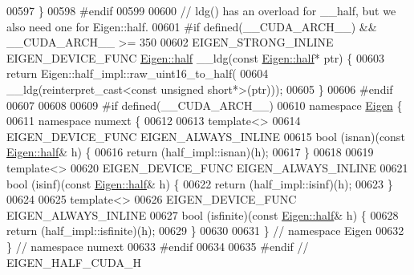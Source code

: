 \begin{DoxyCode}
00597 \}
00598 \textcolor{preprocessor}{#endif}
00599 
00600 \textcolor{comment}{// ldg() has an overload for \_\_half, but we also need one for Eigen::half.}
00601 \textcolor{preprocessor}{#if defined(\_\_CUDA\_ARCH\_\_) && \_\_CUDA\_ARCH\_\_ >= 350}
00602 EIGEN\_STRONG\_INLINE EIGEN\_DEVICE\_FUNC \hyperlink{struct_eigen_1_1half}{Eigen::half} \_\_ldg(\textcolor{keyword}{const} 
      \hyperlink{struct_eigen_1_1half}{Eigen::half}* ptr) \{
00603   \textcolor{keywordflow}{return} Eigen::half\_impl::raw\_uint16\_to\_half(
00604       \_\_ldg(reinterpret\_cast<const unsigned short*>(ptr)));
00605 \}
00606 \textcolor{preprocessor}{#endif}
00607 
00608 
00609 \textcolor{preprocessor}{#if defined(\_\_CUDA\_ARCH\_\_)}
00610 \textcolor{keyword}{namespace }\hyperlink{namespace_eigen}{Eigen} \{
00611 \textcolor{keyword}{namespace }numext \{
00612 
00613 \textcolor{keyword}{template}<>
00614 EIGEN\_DEVICE\_FUNC EIGEN\_ALWAYS\_INLINE
00615 bool (isnan)(\textcolor{keyword}{const} \hyperlink{struct_eigen_1_1half}{Eigen::half}& h) \{
00616   \textcolor{keywordflow}{return} (half\_impl::isnan)(h);
00617 \}
00618 
00619 \textcolor{keyword}{template}<>
00620 EIGEN\_DEVICE\_FUNC EIGEN\_ALWAYS\_INLINE
00621 bool (isinf)(\textcolor{keyword}{const} \hyperlink{struct_eigen_1_1half}{Eigen::half}& h) \{
00622   \textcolor{keywordflow}{return} (half\_impl::isinf)(h);
00623 \}
00624 
00625 \textcolor{keyword}{template}<>
00626 EIGEN\_DEVICE\_FUNC EIGEN\_ALWAYS\_INLINE
00627 bool (isfinite)(\textcolor{keyword}{const} \hyperlink{struct_eigen_1_1half}{Eigen::half}& h) \{
00628   \textcolor{keywordflow}{return} (half\_impl::isfinite)(h);
00629 \}
00630 
00631 \} \textcolor{comment}{// namespace Eigen}
00632 \}  \textcolor{comment}{// namespace numext}
00633 \textcolor{preprocessor}{#endif}
00634 
00635 \textcolor{preprocessor}{#endif // EIGEN\_HALF\_CUDA\_H}
\end{DoxyCode}
